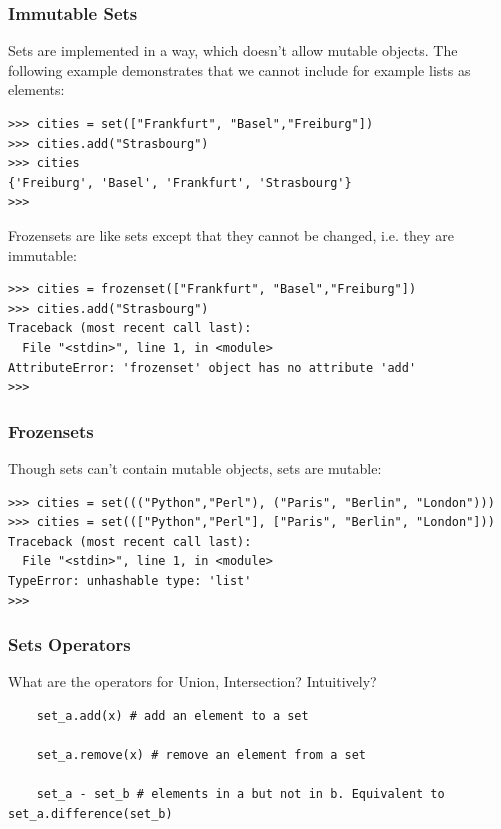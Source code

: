 \begin{frame}[fragile]\frametitle{Immutable Sets}
Sets are implemented in a way, which doesn't allow mutable objects. The following example demonstrates that we cannot include for example lists as elements:
\begin{lstlisting}
>>> cities = set(["Frankfurt", "Basel","Freiburg"])
>>> cities.add("Strasbourg")
>>> cities
{'Freiburg', 'Basel', 'Frankfurt', 'Strasbourg'}
>>> 
\end{lstlisting}
Frozensets are like sets except that they cannot be changed, i.e. they are immutable:
\begin{lstlisting}
>>> cities = frozenset(["Frankfurt", "Basel","Freiburg"])
>>> cities.add("Strasbourg")
Traceback (most recent call last):
  File "<stdin>", line 1, in <module>
AttributeError: 'frozenset' object has no attribute 'add'
>>> 
\end{lstlisting}
\end{frame}

\begin{frame}[fragile]\frametitle{Frozensets}
Though sets can't contain mutable objects, sets are mutable: 

\begin{lstlisting}
>>> cities = set((("Python","Perl"), ("Paris", "Berlin", "London")))
>>> cities = set((["Python","Perl"], ["Paris", "Berlin", "London"]))
Traceback (most recent call last):
  File "<stdin>", line 1, in <module>
TypeError: unhashable type: 'list'
>>> 
\end{lstlisting}

\end{frame}
%


%

\begin{frame}[fragile] \frametitle{Sets Operators}
What are the operators for Union, Intersection? Intuitively?
  \begin{lstlisting}
    set_a.add(x) # add an element to a set

    set_a.remove(x) # remove an element from a set

    set_a - set_b # elements in a but not in b. Equivalent to set_a.difference(set_b)

\end{lstlisting}
\end{frame}

